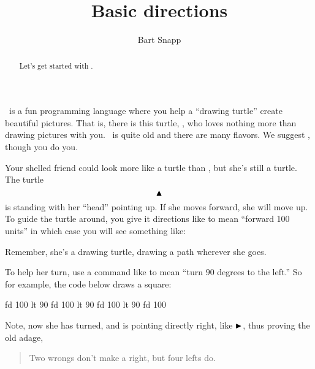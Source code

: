 \documentclass[noauthor,nooutcomes,12pt]{ximera}
\title{Basic directions}
\author{Bart Snapp}
\begin{document}
\begin{abstract}
Let's get started with \LOGO.
\end{abstract}
\maketitle

\nameblankgen

\begin{multicols}{2}
\LOGO~is a fun programming language where you help a ``drawing
turtle'' create beautiful pictures. That is, there is this turtle,
\turtle, who loves nothing more than drawing pictures with
you. \LOGO~is quite old and there are many flavors. We suggest
\logoFlavor, though you do you.

Your shelled friend could look more like a turtle than \turtle, but
she's still a turtle. The turtle
\[
\text{$\blacktriangle$}
\]
is standing with her ``head'' pointing up. If she moves forward, she
will move up.  To guide the turtle around, you give it directions like
 to mean ``forward 100 units'' in which case you will see
something like:
\begin{logoout}
\end{logoout}
Remember, she's a drawing turtle, drawing a path wherever she goes.

To help her turn, use a command like  to mean ``turn $90$
degrees to the left.'' So for example, the code below draws a square:

\begin{logo}
fd 100
lt 90
fd 100
lt 90
fd 100
lt 90
fd 100
\end{logo}
\begin{logoout}
\end{logoout}

Note, now she has turned, and is pointing directly right, like
$\text{$\blacktriangleright$}$, thus proving the old adage,
\begin{quote}
  Two wrongs don't make a right, but four lefts do.
\end{quote}
\end{multicols}
\end{document}
